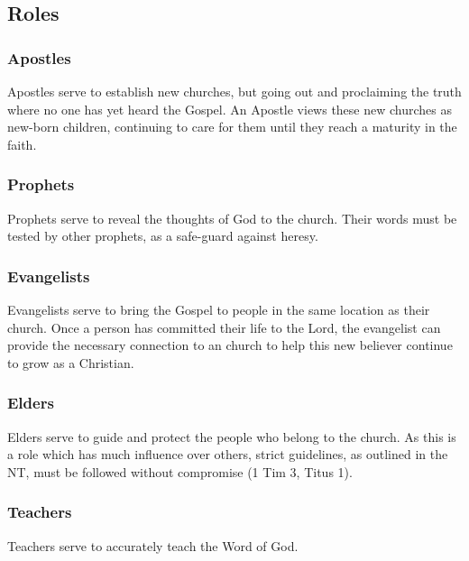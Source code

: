 \subsection{Roles}



\subsubsection{Apostles}

Apostles serve to establish new churches, but going out and proclaiming the truth where no one has yet heard the Gospel. An Apostle views these new churches as new-born children, continuing to care for them until they reach a maturity in the faith.



\subsubsection{Prophets}

Prophets serve to reveal the thoughts of God to the church. Their words must be tested by other prophets, as a safe-guard against heresy.



\subsubsection{Evangelists}

Evangelists serve to bring the Gospel to people in the same location as their church. Once a person has committed their life to the Lord, the evangelist can provide the necessary connection to an church to help this new believer continue to grow as a Christian.



\subsubsection{Elders}

Elders serve to guide and protect the people who belong to the church. As this is a role which has much influence over others, strict guidelines, as outlined in the NT, must be followed without compromise (1 Tim 3, Titus 1).



\subsubsection{Teachers}

Teachers serve to accurately teach the Word of God.



